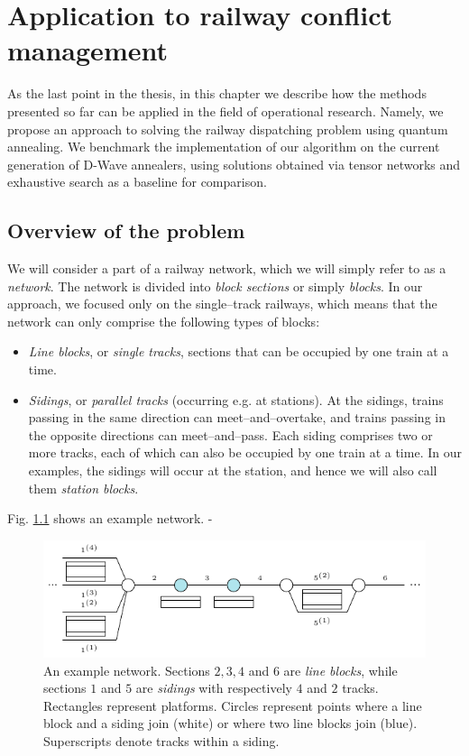 \chapter[Railway conflict management]{Application to railway conflict management}
\label{chapter:trains}
As the last point in the thesis, in this chapter we describe how the methods
presented so far can be applied in the field of operational research. Namely,
we propose an approach to solving the railway dispatching problem using quantum
annealing. We benchmark the implementation of our algorithm on the current
generation of D-Wave annealers, using solutions obtained via tensor networks
and exhaustive search as a baseline for comparison.

\section{Overview of the problem}
We will consider a part of a railway network, which we will simply refer to as
a \emph{network}. The network is divided into \emph{block sections} or simply
\emph{blocks}. In our approach, we focused only on the single--track railways,
which means that the network can only comprise the following types of blocks:
\begin{itemize}
  \item \emph{Line blocks}, or \emph{single tracks}, sections that can be occupied by one train
    at a time.
  \item \emph{Sidings}, or \emph{parallel tracks} (occurring e.g. at stations). At the sidings,
    trains passing in the same direction can meet--and--overtake, and trains passing
    in the opposite directions can meet--and--pass. Each siding comprises two or more
    tracks, each of which can also be occupied by one train at a time. In our examples, the
    sidings will occur at the station, and hence we will also call them \emph{station blocks}.
\end{itemize}
Fig. \ref{fig:railway-network} shows an example network. -
\begin{figure}[ht]
  \includegraphics[width=\textwidth]{figures/example_line}
  \caption{
    An example network. Sections $2, 3, 4$ and $6$ are \emph{line blocks}, while
    sections $1$ and $5$ are \emph{sidings} with respectively $4$ and $2$ tracks.
    Rectangles represent platforms. Circles represent points where a line block and
    a siding join (white) or where two line blocks join (blue). Superscripts denote
    tracks within a siding. } \label{fig:railway-network}
\end{figure}

